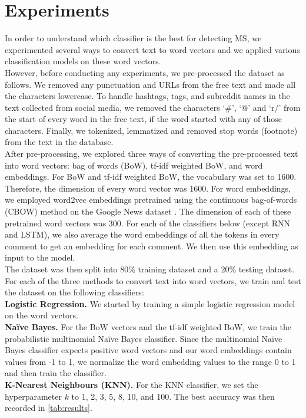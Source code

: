 \documentclass[11pt,a4paper]{article}
\begin{document}
\section{Experiments}
In order to understand which classifier is the best for detecting MS, we experimented several ways to convert text to word vectors and we applied various classification models on these word vectors. \\
\indent However, before conducting any experiments, we pre-processed the dataset as follows. We removed any punctuation and URLs from the free text and made all the characters lowercase. To handle hashtags, tags, and subreddit names in the text collected from social media, we removed the characters ‘\#’, ‘@’ and ‘r/’ from the start of every word in the free text, if the word started with any of those characters. Finally, we tokenized, lemmatized and removed stop words (footnote) from the text in the database. \\
\indent After pre-processing, we explored three ways of converting the pre-processed text into word vectors: bag of words (BoW), tf-idf weighted BoW, and word embeddings. For BoW and tf-idf weighted BoW, the vocabulary was set to 1600. Therefore, the dimension of every word vector was 1600. For word embeddings, we employed word2vec embeddings pretrained using the continuous bag-of-words (CBOW) method on the Google News dataset \citep{Mikolav:13}. The dimension of each of these pretrained word vectors was 300. For each of the classifiers below (except RNN and LSTM), we also average the word embeddings of all the tokens in every comment to get an embedding for each comment. We then use this embedding as input to the model. \\
\indent The dataset was then split into 80\% training dataset and a 20\% testing dataset. For each of the three methods to convert text into word vectors, we train and test the dataset on the following classifiers: \\
\indent \textbf{Logistic Regression.} We started by training a simple logistic regression model on the word vectors. \\
\indent \textbf{Naïve Bayes.} For the BoW vectors and the tf-idf weighted BoW, we train the probabilistic multinomial Naïve Bayes classifier. Since the multinomial Naïve Bayes classifier expects positive word vectors and our word embeddings contain values from -1 to 1, we normalize the word embedding values to the range 0 to 1 and then train the classifier. \\
\indent \textbf{K-Nearest Neighbours (KNN).} For the KNN classifier, we set the hyperparameter $k$ to 1, 2, 3, 5, 8, 10, and 100. The best accuracy was then recorded in \autoref{tab:results}. \\
\end{document}

